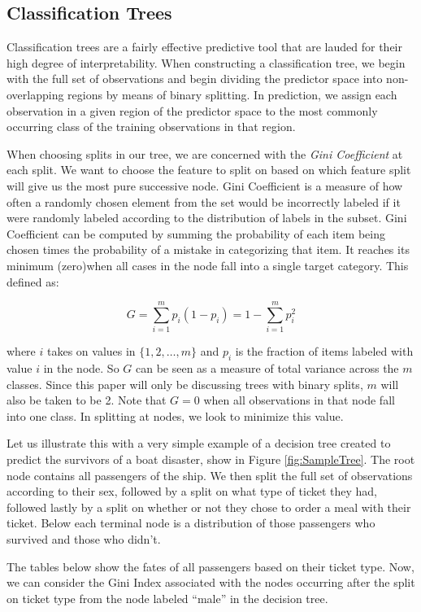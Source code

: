 \documentclass[preprint,12pt]{elsarticle}
\begin{document}
\subsection{Classification Trees}
Classification trees are a fairly effective predictive tool that are lauded for their high degree of interpretability. When constructing a classification tree, we begin with the full set of observations and begin dividing the predictor space into non-overlapping regions by means of binary splitting. In prediction, we assign each observation in a given region of the predictor space to the most commonly occurring class of the training observations in that region. 

When choosing splits in our tree, we are concerned with the \textit{Gini Coefficient} at each split. We want to choose the feature to split on based on which feature split will give us the most pure successive node. Gini Coefficient is a measure of how often a randomly chosen element from the set would be incorrectly labeled if it were randomly labeled according to the distribution of labels in the subset. Gini Coefficient can be computed by summing the probability of each item being chosen times the probability of a mistake in categorizing that item. It reaches its minimum (zero)when all cases in the node fall into a single target category. This defined as:

$$G = \sum\limits_{i=1}^m p_{i}(1-p_{i}) = 1 - \sum\limits_{i=1}^m p_{i}^{2}$$

\noindent where $i$ takes on values in $\{1,2,\ldots,m\}$ and $p_i$ is the fraction of items labeled with value $i$ in the node. So $G$ can be seen as a measure of total variance across the $m$ classes. Since this paper will only be discussing trees with binary splits, $m$ will also be taken to be 2. Note that $G = 0$ when all observations in that node fall into one class. In splitting at nodes, we look to minimize this value.

Let us illustrate this with a very simple example of a decision tree created to predict the survivors of a boat disaster, show in Figure \ref{fig:SampleTree}. The root node contains all passengers of the ship. We then split the full set of observations according to their sex, followed by a split on what type of ticket they had, followed lastly by a split on whether or not they chose to order a meal with their ticket. Below each terminal node is a distribution of those passengers who survived and those who didn't. 

The tables below show the fates of all passengers based on their ticket type. Now, we can consider the Gini Index associated with the nodes occurring after the split on ticket type from the node labeled ``male'' in the decision tree.
\end{document}
